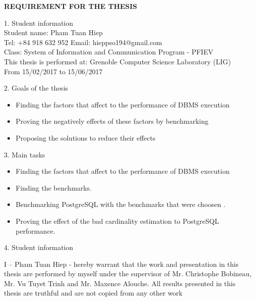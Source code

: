 	{\scshape\Large\bfseries\centering REQUIREMENT FOR THE THESIS \par}
	\vspace{1cm}
\begin{flushleft}
	{1. Student information \\
	\vspace{0.5cm}
	Student name: Pham Tuan Hiep\\
	Tel: +84 918 632 952        Email: hieppso194@gmail.com\\
	Class: System of Information and Communication Program - PFIEV\\
	This thesis is performed at: Grenoble Computer Science Laboratory (LIG)\\
	From 15/02/2017 to 15/06/2017 \par}
	\vspace{0.5cm}
	{2. Goals of the thesis \\
	\begin{itemize}
	\item Finding the factors that affect to the performance of DBMS execution
	\item Proving the negatively effects of these factors by benchmarking
	\item Proposing the solutions to reduce their effects 
	\end{itemize}
	\par}
	\vspace{0.5cm}
	{3. Main tasks\\
	\begin{itemize}
	\item Finding the factors that affect to the performance of DBMS execution
	\item Finding the benchmarks.
	\item Benchmarking PostgreSQL with the benchmarks that were choosen .
	\item Proving the effect of the bad cardinality estimation to PostgreSQL performance.
	\end{itemize}
	\par}
	{4. Student information \\
	\vspace{0.5cm}
	{\justify
	I – Pham Tuan Hiep - hereby warrant that the work and presentation in this thesis are performed by myself under the supervisor of Mr. Christophe Bobineau, Mr. Vu Tuyet Trinh and Mr. Maxence Alouche. All results presented in this thesis are truthful and are not copied from any other
	work \par }
	\begin{flushright}

\end{flushright}}
\end{flushleft}
